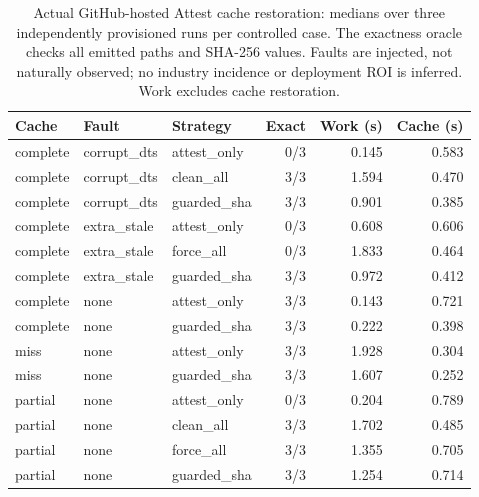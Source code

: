 \begin{table}[t]
\centering
\footnotesize
\begin{tabular}{lllrrr}
\toprule
Cache & Fault & Strategy & Exact & Work (s) & Cache (s) \\
\midrule
complete & corrupt\_dts & attest\_only & 0/3 & 0.145 & 0.583 \\
complete & corrupt\_dts & clean\_all & 3/3 & 1.594 & 0.470 \\
complete & corrupt\_dts & guarded\_sha & 3/3 & 0.901 & 0.385 \\
complete & extra\_stale & attest\_only & 0/3 & 0.608 & 0.606 \\
complete & extra\_stale & force\_all & 0/3 & 1.833 & 0.464 \\
complete & extra\_stale & guarded\_sha & 3/3 & 0.972 & 0.412 \\
complete & none & attest\_only & 3/3 & 0.143 & 0.721 \\
complete & none & guarded\_sha & 3/3 & 0.222 & 0.398 \\
miss & none & attest\_only & 3/3 & 1.928 & 0.304 \\
miss & none & guarded\_sha & 3/3 & 1.607 & 0.252 \\
partial & none & attest\_only & 0/3 & 0.204 & 0.789 \\
partial & none & clean\_all & 3/3 & 1.702 & 0.485 \\
partial & none & force\_all & 3/3 & 1.355 & 0.705 \\
partial & none & guarded\_sha & 3/3 & 1.254 & 0.714 \\
\bottomrule
\end{tabular}
\caption{Actual GitHub-hosted Attest cache restoration: medians over three independently provisioned runs per controlled case. The exactness oracle checks all emitted paths and SHA-256 values. Faults are injected, not naturally observed; no industry incidence or deployment ROI is inferred. Work excludes cache restoration.}
\label{tab:n21-gha-attest}
\end{table}
